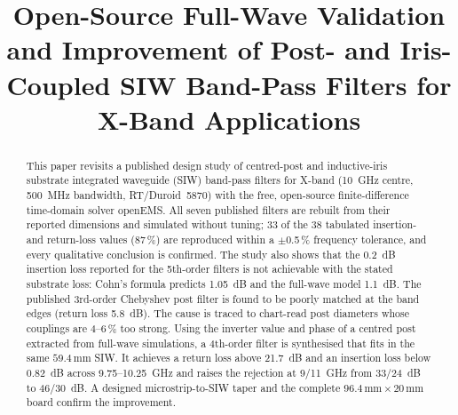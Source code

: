 \documentclass[conference]{IEEEtran}
\newcommand{\SI}[2]{\ensuremath{#1\,\mathrm{#2}}}
\begin{document}
\title{Open-Source Full-Wave Validation and Improvement of Post- and Iris-Coupled SIW Band-Pass Filters for X-Band Applications}

\author{
\and
{}
}
\maketitle

\begin{abstract}
This paper revisits a published design study of centred-post and inductive-iris substrate integrated waveguide (SIW) band-pass filters for X-band (10~GHz centre, 500~MHz bandwidth, RT/Duroid~5870) with the free, open-source finite-difference time-domain solver openEMS. All seven published filters are rebuilt from their reported dimensions and simulated without tuning; 33 of the 38 tabulated insertion- and return-loss values (87\,\%) are reproduced within a $\pm$0.5\,\% frequency tolerance, and every qualitative conclusion is confirmed. The study also shows that the 0.2~dB insertion loss reported for the 5th-order filters is not achievable with the stated substrate loss: Cohn's formula predicts 1.05~dB and the full-wave model 1.1~dB. The published 3rd-order Chebyshev post filter is found to be poorly matched at the band edges (return loss 5.8~dB). The cause is traced to chart-read post diameters whose couplings are 4--6\,\% too strong. Using the inverter value and phase of a centred post extracted from full-wave simulations, a 4th-order filter is synthesised that fits in the same \SI{59.4}{mm} SIW. It achieves a return loss above 21.7~dB and an insertion loss below 0.82~dB across 9.75--10.25~GHz and raises the rejection at 9/11~GHz from 33/24~dB to 46/30~dB. A designed microstrip-to-SIW taper and the complete \SI{96.4}{mm}\,$\times$\,\SI{20}{mm} board confirm the improvement.
\end{abstract}
\end{document}
